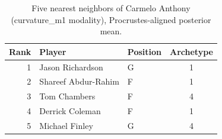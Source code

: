 \begin{table}[htbp]
  \centering\small
  \begin{tabular}{rllc}
    \toprule
    Rank & Player & Position & Archetype \\
    \midrule
    1 & Jason Richardson & G & 1 \\
    2 & Shareef Abdur-Rahim & F & 1 \\
    3 & Tom Chambers & F & 4 \\
    4 & Derrick Coleman & F & 1 \\
    5 & Michael Finley & G & 4 \\
    \bottomrule
  \end{tabular}
  \caption{Five nearest neighbors of Carmelo Anthony (curvature_m1 modality), Procrustes-aligned posterior mean.}
  \label{tab:Carmelo_Anthony_neighbors_curvature_m1}
\end{table}

